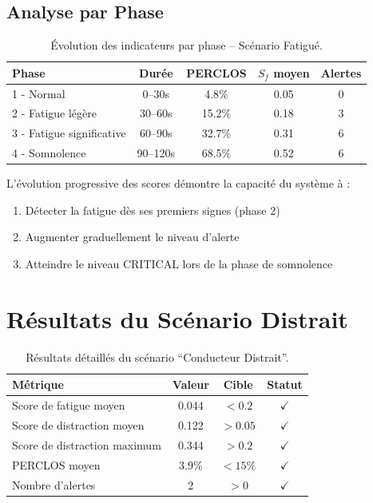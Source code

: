 \documentclass[12pt,a4paper,twoside]{report}
\begin{document}
\subsection{Analyse par Phase}

\begin{table}[H]
\centering
\caption{Évolution des indicateurs par phase -- Scénario Fatigué.}
\label{tab:fatigue_phases}
\renewcommand{\arraystretch}{1.3}
\begin{tabular}{|l|c|c|c|c|}
\hline
\rowcolor{stellantisblue!15}
\textbf{Phase} & \textbf{Durée} & \textbf{PERCLOS} & \textbf{$S_f$ moyen} & \textbf{Alertes} \\
\hline
1 - Normal & 0--30s & 4.8\% & 0.05 & 0 \\
\hline
2 - Fatigue légère & 30--60s & 15.2\% & 0.18 & 3 \\
\hline
3 - Fatigue significative & 60--90s & 32.7\% & 0.31 & 6 \\
\hline
4 - Somnolence & 90--120s & 68.5\% & 0.52 & 6 \\
\hline
\end{tabular}
\end{table}

L'évolution progressive des scores démontre la capacité du système à :
\begin{enumerate}
    \item Détecter la fatigue dès ses premiers signes (phase 2)
    \item Augmenter graduellement le niveau d'alerte
    \item Atteindre le niveau CRITICAL lors de la phase de somnolence
\end{enumerate}

\section{Résultats du Scénario Distrait}

\begin{table}[H]
\centering
\caption{Résultats détaillés du scénario ``Conducteur Distrait''.}
\label{tab:results_distrait}
\renewcommand{\arraystretch}{1.3}
\begin{tabular}{|l|c|c|c|}
\hline
\rowcolor{purple!15}
\textbf{Métrique} & \textbf{Valeur} & \textbf{Cible} & \textbf{Statut} \\
\hline
Score de fatigue moyen & 0.044 & $< 0.2$ & $\checkmark$ \\
\hline
Score de distraction moyen & 0.122 & $> 0.05$ & $\checkmark$ \\
\hline
Score de distraction maximum & 0.344 & $> 0.2$ & $\checkmark$ \\
\hline
PERCLOS moyen & 3.9\% & $< 15\%$ & $\checkmark$ \\
\hline
Nombre d'alertes & 2 & $> 0$ & $\checkmark$ \\
\hline
\end{tabular}
\end{table}
\end{document}
